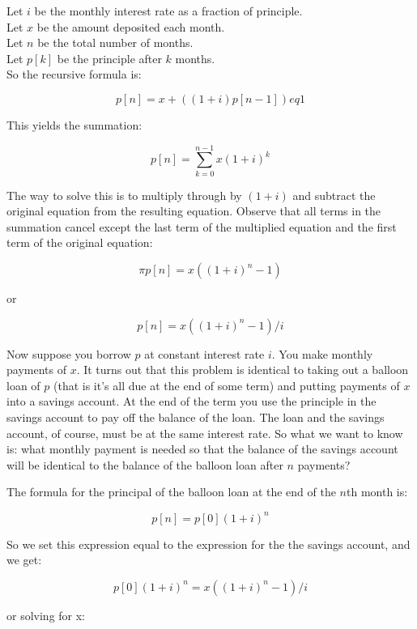      \noindent Let $i$ be the monthly interest rate as a fraction of
        principle.\\
     Let $x$ be the amount deposited each month.\\
     Let $n$ be the total number of months.\\
     Let $p[k]$ be the principle after $k$ months.\\

     \noindent So the recursive formula is:

          \[p[n] = x + ( (1 + i)  p[n-1] )                  eq 1\]

     This yields the summation:

\[ p[n]=\sum_{k=0}^{n-1}x  (1 + i)^k \]

     The way to solve this is to multiply through by $(1 + i)$ and
     subtract the original equation from the resulting equation.
     Observe that all terms in the summation cancel except the
     last term of the multiplied equation and the first term of
     the original equation:


          \[\pi  p[n] = x  ( (1 + i)^n - 1)                  \]

     or

          \[p[n] = x  ( (1 + i)^n - 1) / i                  \]

     Now suppose you borrow $p$ at constant interest rate $i$.
     You make monthly payments of $x$.  It turns out that this problem
     is identical to taking out a balloon loan of $p$ (that is it's
     all due at the end of some term) and putting payments of $x$
     into a savings account.  At the end of the term you use the
     principle in the savings account to pay off the balance of
     the loan.  The loan and the savings account, of course, must
     be at the same interest rate.  So what we want to know is:
     what monthly payment is needed so that the balance of the
     savings account will be identical to the balance of the balloon
     loan after $n$ payments?

     The formula for the principal of the balloon loan at the
     end of the $n$th month is:

          \[p[n] = p[0]  (1 + i)^n                         \]

     So we set this expression equal to the expression for the
     the savings account, and we get:

 \[          p[0]  (1 + i)^n  =  x  ( (1 + i)^n - 1) / i    \]

     or solving for x:

